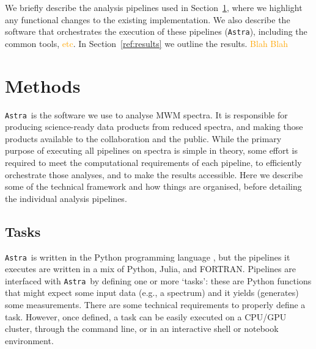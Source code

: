 \documentclass[modern]{aastex631}
\newcommand{\astra}{\texttt{Astra}}
\newcommand{\Astra}{\astra}
\newcommand{\todo}[1]{\textcolor{orange}{#1}}
\begin{document}
We briefly describe the analysis pipelines used in Section~\ref{sec:method}, where we highlight any functional changes to the existing implementation. We also describe the software that orchestrates the execution of these pipelines (\texttt{Astra}), including the common tools, \todo{etc}. In Section~\ref{ref:results} we outline the results. \todo{Blah Blah}\\

\section{Methods}\label{sec:method}

\Astra\ is the software we use to analyse MWM spectra.
It is responsible for producing science-ready data products from reduced spectra, and making those products available to the collaboration and the public.
While the primary purpose of executing all pipelines on spectra is simple in theory, some effort is required to meet the computational requirements of each pipeline, to efficiently orchestrate those analyses, and to make the results accessible.
Here we describe some of the technical framework and how things are organised, before detailing the individual analysis pipelines.


\subsection{Tasks} \label{ref:tasks}

\Astra\ is written in the Python programming language \citep{python}, but the pipelines it executes are written in a mix of Python, Julia, and FORTRAN. 
Pipelines are interfaced with \Astra\ by defining one or more `tasks': these are Python functions that might expect some input data (e.g., a spectrum) and it yields (generates) some measurements.
There are some technical requirements to properly define a task.
However, once defined, a task can be easily executed on a CPU/GPU cluster, through the command line, or in an interactive shell or notebook environment.\\
\end{document}
